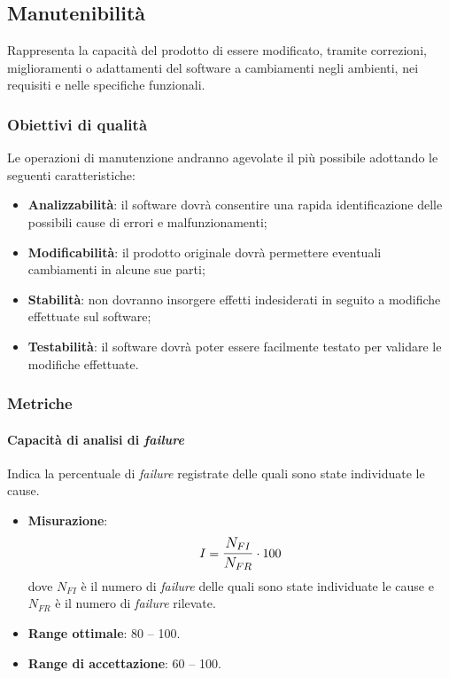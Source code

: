 \subsection{Manutenibilità}
Rappresenta la capacità del prodotto di essere modificato, tramite correzioni, miglioramenti o adattamenti del software a cambiamenti negli ambienti, nei requisiti e nelle specifiche funzionali.

\subsubsection{Obiettivi di qualità}
Le operazioni di manutenzione andranno agevolate il più possibile adottando le seguenti caratteristiche:
\begin{itemize}
\item \textbf{Analizzabilità}: il software dovrà consentire una rapida identificazione delle possibili cause di errori e malfunzionamenti;
\item \textbf{Modificabilità}: il prodotto originale dovrà permettere eventuali cambiamenti in alcune sue parti;
\item \textbf{Stabilità}: non dovranno insorgere effetti indesiderati in seguito a modifiche effettuate sul software;
\item \textbf{Testabilità}: il software dovrà poter essere facilmente testato per validare le modifiche effettuate.
\end{itemize}

\subsubsection{Metriche}
\paragraph{Capacità di analisi di \textit{failure}}
Indica la percentuale di \textit{failure} registrate delle quali sono state individuate le cause.
\begin{itemize}
	\item \textbf{Misurazione}: 
		$$I=\mathlarger{\frac{N_{FI}}{N_{FR}}} \cdot 100$$
	dove $N_{FI}$ è il numero di \textit{failure} delle quali sono state individuate le cause e $N_{FR}$ è il numero di \textit{failure} rilevate.
	\item \textbf{Range ottimale}: 80 -- 100.
	\item \textbf{Range di accettazione}: 60 -- 100.
\end{itemize}

